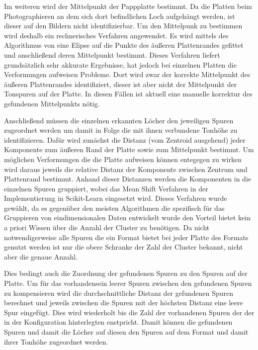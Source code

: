 Im weiteren wird der Mittelpunkt der Pappplatte bestimmt.
Da die Platten beim Photographieren an dem sich dort befindlichen Loch aufgehängt werden, ist dieser auf den Bildern nicht identifizierbar.
Um den Mittelpunk zu bestimmen wird deshalb ein rechnerisches Verfahren angewendet.
Es wird mittels des Algorithmus von \textcite[]{halir1998numerically} eine Elipse auf die Punkte des äußeren Plattenrandes gefittet und anschließend deren Mittelpunkt bestimmt.
Dieses Verfahren liefert grundsätzlich sehr akkurate Ergebnisse, hat jedoch bei einzelnen Platten die Verformungen aufweisen Probleme.
Dort wird zwar der korrekte Mittelpunkt des äußeren Plattenrandes identifiziert, dieser ist aber nicht der Mittelpunkt der Tonspuren auf der Platte.
In diesen Fällen ist aktuell eine manuelle korrektur des gefundenen Mittelpunkts nötig.

Anschließend müssen die einzelnen erkannten Löcher den jeweiligen Spuren zugeordnet werden um damit in Folge die mit ihnen verbundene Tonhöhe zu identifizieren.
Dafür wird zunächst die Distanz (vom Zentroid ausgehend) jeder Komponente zum äußeren Rand der Platte sowie zum Mittelpunkt bestimmt.
Um möglichen Verformungen die die Platte aufweisen können entegegen zu wirken wird daraus jeweils die relative Distanz der Komponente zwischen Zentrum und Plattenrand bestimmt.
Anhand dieser Distanzen werden die Komponenten in die einzelnen Spuren gruppiert, wobei das Mean Shift Verfahren \parencite[]{meanshift} in der Implementierung in Scikit-Learn \parencite[]{scikit-learn} eingesetzt wird.
Dieses Verfahren wurde gewählt, da es gegenüber den meisten Algorithmen die spezifisch für das Gruppieren von eindimensionalen Daten entwickelt wurde den Vorteil bietet kein a priori Wissen über die Anzahl der Cluster zu benötigen.
Da nicht notwendigerweise alle Spuren die ein Format bietet bei jeder Platte des Formats genutzt werden ist nur die obere Schranke der Zahl der Cluster bekannt, nicht aber die genaue Anzahl.

Dies bedingt auch die Zuordnung der gefundenen Spuren zu den Spuren auf der Platte.
Um für das vorhandensein leerer Spuren zwischen den gefundenen Spuren zu kompensieren wird die durchschnittliche Distanz der gefundenen Spuren berechnet und jeweils zwischen die Spuren mit der höchsten Distanz eine leere Spur eingefügt.
Dies wird wiederholt bis die Zahl der vorhandenen Spuren der der in der Konfiguration hinterlegten enstpricht.
Damit können die gefundenen Spuren und damit die Löcher auf diesen den Spuren auf dem Format und damit ihrer Tonhöhe zugeordnet werden.

